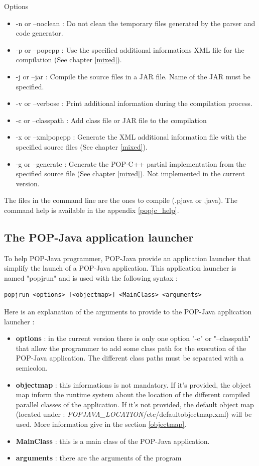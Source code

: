 Options
\begin{itemize}
\item -n or --noclean : Do not clean the temporary files generated by the parser and code generator. 
\item -p or --popcpp : Use the specified additional informations XML file for the compilation (See chapter \ref{mixed}).
\item -j or --jar : Compile the source files in a JAR file. Name of the JAR must be specified.
\item -v or --verbose : Print additional information during the compilation process. 
\item -c or --classpath : Add class file or JAR file to the compilation
\item -x or --xmlpopcpp : Generate the XML additional information file with the specified source files (See chapter \ref{mixed}).
\item -g or --generate : Generate the POP-C++ partial implementation from the specified source file (See chapter \ref{mixed}). Not implemented in the current version.
\end{itemize}

The files in the command line are the ones to compile (.pjava or .java). The command help is available in the appendix \ref{popjc_help}.


\subsection{The POP-Java application launcher}
To help POP-Java programmer, POP-Java provide an application launcher that simplify the launch of a POP-Java application. This application launcher is named "popjrun" and is used with the following syntax : 

\begin{lstlisting}
popjrun <options> [<objectmap>] <MainClass> <arguments>
\end{lstlisting}\s

Here is an explanation of the arguments to provide to the POP-Java application launcher : 

\begin{itemize}
\item \textbf{options} : in the current version there is only one option "-c" or "--classpath" that allow the programmer to add some class path for the execution of the POP-Java application. The different class paths must be separated with a semicolon.
\item \textbf{objectmap} : this informations is not mandatory. If it's provided, the object map inform the runtime system about the location of the different compiled parallel classes of the application. If it's not provided, the default object map (located under : \textit{POPJAVA\_LOCATION}/etc/defaultobjectmap.xml) will be used. More information give in the section \ref{objectmap}.
\item \textbf{MainClass} : this is a main class of the POP-Java application.
\item \textbf{arguments} : there are the arguments of the program
\end{itemize}


